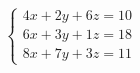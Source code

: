 \documentclass[preview]{standalone}
\begin{document}
\begin{align*}
\begin{cases} 4x + 2y + 6z = 10 \\ 6x + 3y + 1z = 18 \\ 8x + 7y + 3z = 11 \end{cases}
\end{align*}
\end{document}
